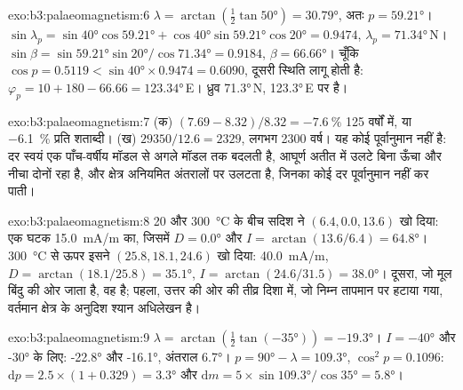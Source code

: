 \begin{solution}{exo:b3:palaeomagnetism:6}
$\lambda = \arctan(\tfrac12\tan\ang{50}) = \ang{30.79}$, अतः $p = \ang{59.21}$।
\newline $\sin\lambda_p = \sin\ang{40}\cos\ang{59.21} + \cos\ang{40}\sin\ang{59.21}
\cos\ang{20} = 0.9474$, $\lambda_p = \ang{71.34}$\,N। $\sin\beta =
\sin\ang{59.21}\sin\ang{20}/\cos\ang{71.34} = 0.9184$, $\beta = \ang{66.66}$।
चूँकि $\cos p = 0.5119 < \sin\ang{40}\times0.9474 = 0.6090$, दूसरी स्थिति
लागू होती है: $\varphi_p = 10 + 180 - 66.66 = \ang{123.34}$\,E। ध्रुव
\ang{71.3}\,N, \ang{123.3}\,E पर है।
\end{solution}

\begin{solution}{exo:b3:palaeomagnetism:7}
(क) $(7.69 - 8.32)/8.32 = \qty{-7.6}{\percent}$ 125 वर्षों में, या
\qty{-6.1}{\percent} प्रति शताब्दी। (ख) $29350/12.6 = 2329$, लगभग 2300 वर्ष।
यह कोई पूर्वानुमान नहीं है: दर स्वयं एक पाँच-वर्षीय मॉडल से
अगले मॉडल तक बदलती है, आघूर्ण अतीत में उलटे बिना ऊँचा और नीचा दोनों रहा है, और
क्षेत्र अनियमित अंतरालों पर उलटता है, जिनका
कोई दर पूर्वानुमान नहीं कर पाती।
\end{solution}

\begin{solution}{exo:b3:palaeomagnetism:8}
20 और \qty{300}{\celsius} के बीच सदिश ने $(6.4, 0.0, 13.6)$ खो दिया: एक
घटक \qty{15.0}{mA/m} का, जिसमें $D = \ang{0.0}$ और
$I = \arctan(13.6/6.4) = \ang{64.8}$। \qty{300}{\celsius} से ऊपर इसने $(25.8, 18.1, 24.6)$ खो दिया:
\qty{40.0}{mA/m}, $D = \arctan(18.1/25.8) = \ang{35.1}$, $I =
\arctan(24.6/31.5) = \ang{38.0}$। दूसरा, जो मूल बिंदु की ओर जाता है, वह
 है; पहला, उत्तर की ओर की तीव्र दिशा में, जो
निम्न तापमान पर हटाया गया, वर्तमान क्षेत्र के अनुदिश श्यान अधिलेखन है।
\end{solution}

\begin{solution}{exo:b3:palaeomagnetism:9}
$\lambda = \arctan(\tfrac12\tan(\ang{-35})) = \ang{-19.3}$। $I = \ang{-40}$
और \ang{-30} के लिए: \ang{-22.8} और \ang{-16.1}, अंतराल \ang{6.7}।
$p = \ang{90} - \lambda = \ang{109.3}$, $\cos^2p = 0.1096$:
$\mathrm dp = 2.5\times(1 + 0.329) = \ang{3.3}$ और $\mathrm dm =
5\times\sin\ang{109.3}/\cos\ang{35} = \ang{5.8}$।
\end{solution}

